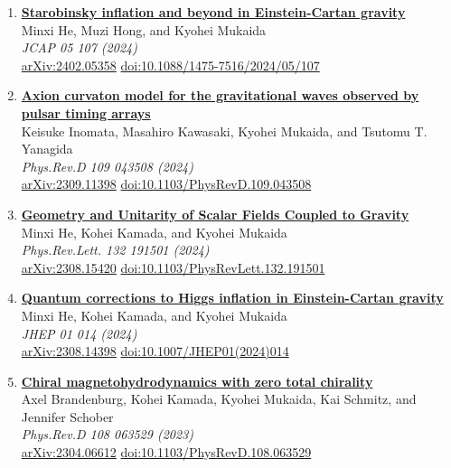 \begin{enumerate}
\item \textbf{\href{https://arxiv.org/abs/2402.05358}{Starobinsky inflation and beyond in Einstein-Cartan gravity}}\\
Minxi He, Muzi Hong, and Kyohei Mukaida\\
\emph{JCAP 05 107 (2024)}
\\ \href{https://arxiv.org/abs/2402.05358}{arXiv:2402.05358} \href{https://doi.org/10.1088/1475-7516/2024/05/107}{doi:10.1088/1475-7516/2024/05/107}

\item \textbf{\href{https://arxiv.org/abs/2309.11398}{Axion curvaton model for the gravitational waves observed by pulsar timing arrays}}\\
Keisuke Inomata, Masahiro Kawasaki, Kyohei Mukaida, and Tsutomu T. Yanagida\\
\emph{Phys.Rev.D 109 043508 (2024)}
\\ \href{https://arxiv.org/abs/2309.11398}{arXiv:2309.11398} \href{https://doi.org/10.1103/PhysRevD.109.043508}{doi:10.1103/PhysRevD.109.043508}

\item \textbf{\href{https://arxiv.org/abs/2308.15420}{Geometry and Unitarity of Scalar Fields Coupled to Gravity}}\\
Minxi He, Kohei Kamada, and Kyohei Mukaida\\
\emph{Phys.Rev.Lett. 132 191501 (2024)}
\\ \href{https://arxiv.org/abs/2308.15420}{arXiv:2308.15420} \href{https://doi.org/10.1103/PhysRevLett.132.191501}{doi:10.1103/PhysRevLett.132.191501}

\item \textbf{\href{https://arxiv.org/abs/2308.14398}{Quantum corrections to Higgs inflation in Einstein-Cartan gravity}}\\
Minxi He, Kohei Kamada, and Kyohei Mukaida\\
\emph{JHEP 01 014 (2024)}
\\ \href{https://arxiv.org/abs/2308.14398}{arXiv:2308.14398} \href{https://doi.org/10.1007/JHEP01(2024)014}{doi:10.1007/JHEP01(2024)014}

\item \textbf{\href{https://arxiv.org/abs/2304.06612}{Chiral magnetohydrodynamics with zero total chirality}}\\
Axel Brandenburg, Kohei Kamada, Kyohei Mukaida, Kai Schmitz, and Jennifer Schober\\
\emph{Phys.Rev.D 108 063529 (2023)}
\\ \href{https://arxiv.org/abs/2304.06612}{arXiv:2304.06612} \href{https://doi.org/10.1103/PhysRevD.108.063529}{doi:10.1103/PhysRevD.108.063529}


\end{enumerate}
